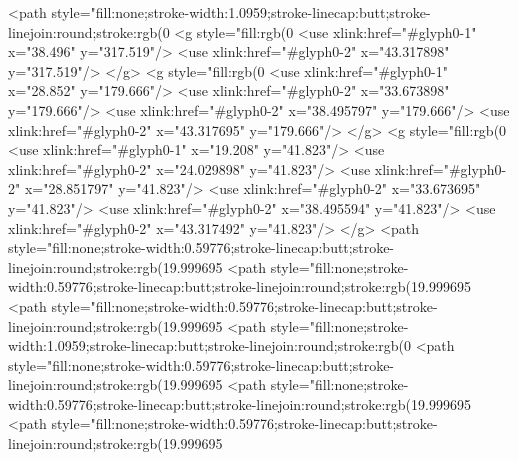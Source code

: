 <path style="fill:none;stroke-width:1.0959;stroke-linecap:butt;stroke-linejoin:round;stroke:rgb(0%
<g style="fill:rgb(0%
  <use xlink:href="#glyph0-1" x="38.496" y="317.519"/>
  <use xlink:href="#glyph0-2" x="43.317898" y="317.519"/>
</g>
<g style="fill:rgb(0%
  <use xlink:href="#glyph0-1" x="28.852" y="179.666"/>
  <use xlink:href="#glyph0-2" x="33.673898" y="179.666"/>
  <use xlink:href="#glyph0-2" x="38.495797" y="179.666"/>
  <use xlink:href="#glyph0-2" x="43.317695" y="179.666"/>
</g>
<g style="fill:rgb(0%
  <use xlink:href="#glyph0-1" x="19.208" y="41.823"/>
  <use xlink:href="#glyph0-2" x="24.029898" y="41.823"/>
  <use xlink:href="#glyph0-2" x="28.851797" y="41.823"/>
  <use xlink:href="#glyph0-2" x="33.673695" y="41.823"/>
  <use xlink:href="#glyph0-2" x="38.495594" y="41.823"/>
  <use xlink:href="#glyph0-2" x="43.317492" y="41.823"/>
</g>
<path style="fill:none;stroke-width:0.59776;stroke-linecap:butt;stroke-linejoin:round;stroke:rgb(19.999695%
<path style="fill:none;stroke-width:0.59776;stroke-linecap:butt;stroke-linejoin:round;stroke:rgb(19.999695%
<path style="fill:none;stroke-width:0.59776;stroke-linecap:butt;stroke-linejoin:round;stroke:rgb(19.999695%
<path style="fill:none;stroke-width:1.0959;stroke-linecap:butt;stroke-linejoin:round;stroke:rgb(0%
<path style="fill:none;stroke-width:0.59776;stroke-linecap:butt;stroke-linejoin:round;stroke:rgb(19.999695%
<path style="fill:none;stroke-width:0.59776;stroke-linecap:butt;stroke-linejoin:round;stroke:rgb(19.999695%
<path style="fill:none;stroke-width:0.59776;stroke-linecap:butt;stroke-linejoin:round;stroke:rgb(19.999695%
